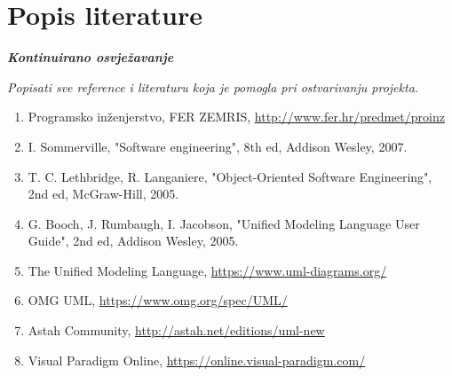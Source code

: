 \chapter*{Popis literature}
	 	
 		\textbf{\textit{Kontinuirano osvježavanje}}
	
		\textit{Popisati sve reference i literaturu koja je pomogla pri ostvarivanju projekta.}
		
		
		\begin{enumerate}
			
			
			\item  Programsko inženjerstvo, FER ZEMRIS, \url{http://www.fer.hr/predmet/proinz}
			
			\item  I. Sommerville, "Software engineering", 8th ed, Addison Wesley, 2007.
			
			\item  T. C. Lethbridge, R. Langaniere, "Object-Oriented Software Engineering", 2nd ed, McGraw-Hill, 2005.
			
			\item  G. Booch, J. Rumbaugh, I. Jacobson, "Unified Modeling Language
User Guide", 2nd ed, Addison Wesley, 2005.		
			
			\item  The Unified Modeling Language, \url{https://www.uml-diagrams.org/}
			
			\item  OMG UML, \url{https://www.omg.org/spec/UML/}
			
			\item  Astah Community, \url{http://astah.net/editions/uml-new}
			
			\item  Visual Paradigm Online, \url{https://online.visual-paradigm.com/}
		\end{enumerate}
		
		 